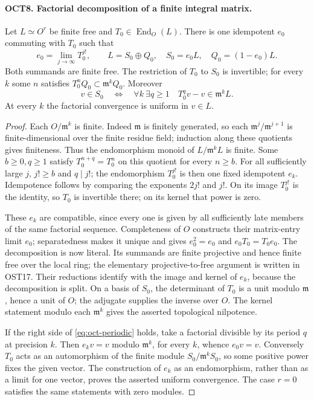 \paragraph{OCT8. Factorial decomposition of a finite integral matrix.}
\label{claim:OCT8}
Let $L\simeq O^r$ be finite free and $T_0\in\operatorname{End}_O(L)$.
There is one idempotent $e_0$ commuting with $T_0$ such that
\[
 e_0=\lim_{j\to\infty}T_0^{j!},\qquad
 L=S_0\oplus Q_0,\quad S_0=e_0L,
                         \quad Q_0=(1-e_0)L.
\]
Both summands are finite free.  The restriction of $T_0$ to
$S_0$ is invertible; for every $k$ some $n$ satisfies
$T_0^nQ_0\subset\mathfrak m^k Q_0$.  Moreover
\begin{equation}\label{eq:oct-periodic}
 v\in S_0\quad\Longleftrightarrow\quad
 \forall k\ \exists q\geq1\quad T_0^qv-v\in\mathfrak m^kL.
\end{equation}
At every $k$ the factorial convergence is uniform in $v\in L$.
\begin{proof}
Each $O/\mathfrak m^k$ is finite.  Indeed
$\mathfrak m$ is finitely generated, so each
$\mathfrak m^j/\mathfrak m^{j+1}$ is finite-dimensional over
the finite residue field; induction along these quotients
gives finiteness.  Thus the endomorphism monoid of
$L/\mathfrak m^kL$ is finite.  Some $b\geq0,q\geq1$ satisfy
$T_0^{n+q}=T_0^n$ on this quotient for every $n\geq b$.
For all sufficiently large $j$, $j!\geq b$ and $q\mid j!$;
the endomorphism $T_0^{j!}$ is then one fixed idempotent $e_k$.
Idempotence follows by comparing the exponents $2j!$ and $j!$.
On its image $T_0^{j!}$ is the identity, so $T_0$ is invertible
there; on its kernel that power is zero.

These $e_k$ are compatible, since every one is given by all
sufficiently late members of the same factorial sequence.
Completeness of $O$ constructs their matrix-entry limit $e_0$;
separatedness makes it unique and gives $e_0^2=e_0$ and
$e_0T_0=T_0e_0$.  The decomposition is now literal.  Its
summands are finite projective and hence finite free over the
local ring; the elementary projective-to-free argument is
written in OST17.  Their reductions identify with the image
and kernel of $e_k$, because the decomposition is split.
On a basis of $S_0$, the determinant of $T_0$ is a unit modulo
$\mathfrak m$, hence a unit of $O$; the adjugate supplies the
inverse over $O$.  The kernel statement modulo each
$\mathfrak m^k$ gives the asserted topological nilpotence.

If the right side of \eqref{eq:oct-periodic} holds, take a
factorial divisible by its period $q$ at precision $k$.
Then $e_kv=v$ modulo $\mathfrak m^k$, for every $k$, whence
$e_0v=v$.  Conversely $T_0$ acts as an automorphism of the
finite module $S_0/\mathfrak m^kS_0$, so some positive power
fixes the given vector.  The construction of $e_k$ as an
endomorphism, rather than as a limit for one vector, proves
the asserted uniform convergence.  The case $r=0$ satisfies
the same statements with zero modules.
\end{proof}

